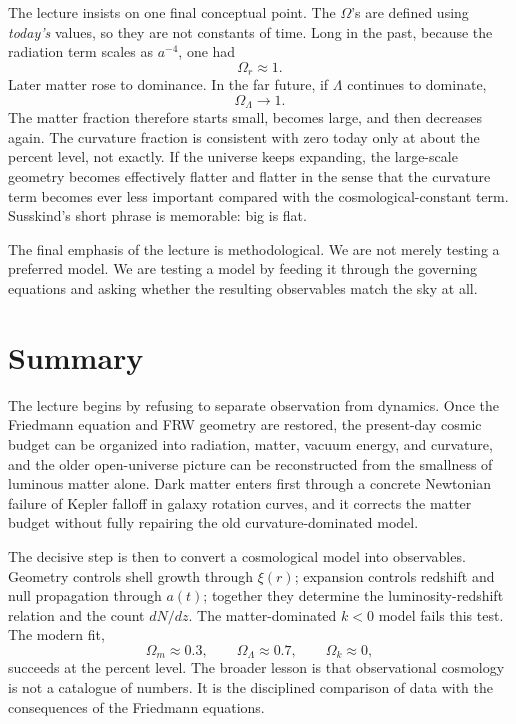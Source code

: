 The lecture insists on one final conceptual point. The \(\Omega\)'s are defined using \emph{today's} values, so they are not constants of time. Long in the past, because the radiation term scales as \(a^{-4}\), one had
\begin{equation}
\Omega_r\approx 1.
\end{equation}
Later matter rose to dominance. In the far future, if \(\Lambda\) continues to dominate,
\begin{equation}
\Omega_\Lambda\to 1.
\end{equation}
The matter fraction therefore starts small, becomes large, and then decreases again. The curvature fraction is consistent with zero today only at about the percent level, not exactly. If the universe keeps expanding, the large-scale geometry becomes effectively flatter and flatter in the sense that the curvature term becomes ever less important compared with the cosmological-constant term. Susskind's short phrase is memorable: big is flat.

The final emphasis of the lecture is methodological. We are not merely testing a preferred model. We are testing a model by feeding it through the governing equations and asking whether the resulting observables match the sky at all.

\section{Summary}

The lecture begins by refusing to separate observation from dynamics. Once the Friedmann equation and FRW geometry are restored, the present-day cosmic budget can be organized into radiation, matter, vacuum energy, and curvature, and the older open-universe picture can be reconstructed from the smallness of luminous matter alone. Dark matter enters first through a concrete Newtonian failure of Kepler falloff in galaxy rotation curves, and it corrects the matter budget without fully repairing the old curvature-dominated model.

The decisive step is then to convert a cosmological model into observables. Geometry controls shell growth through \(\xi(r)\); expansion controls redshift and null propagation through \(a(t)\); together they determine the luminosity-redshift relation and the count \(dN/dz\). The matter-dominated \(k<0\) model fails this test. The modern fit,
\[
\Omega_m\approx 0.3,\qquad
\Omega_\Lambda\approx 0.7,\qquad
\Omega_k\approx 0,
\]
succeeds at the percent level. The broader lesson is that observational cosmology is not a catalogue of numbers. It is the disciplined comparison of data with the consequences of the Friedmann equations.